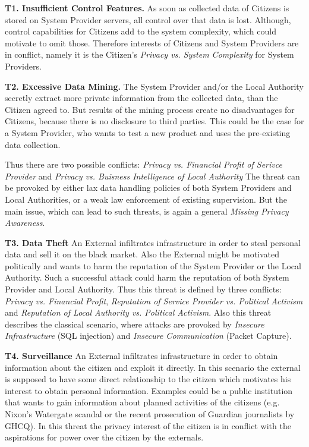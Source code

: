 \documentclass[runningheads,a4paper]{llncs}
\begin{document}
\textbf{T1. Insufficient Control Features.}
As soon as collected data of Citizens is stored on System Provider servers, all control over that data is lost. Although, control capabilities for Citizens add to the system complexity, which could motivate to omit those. Therefore interests of Citizens and System Providers are in conflict, namely it is the Citizen's \textit{Privacy vs. System Complexity} for System Providers.

\textbf{T2. Excessive Data Mining.}
The System Provider and/or the Local Authority secretly extract more private information from the collected data, than the Citizen agreed to. But results of the mining process create no disadvantages for Citizens, because there is no disclosure to third parties. This could be the case for a System Provider, who wants to test a new product and uses the pre-existing data collection.

Thus there are two possible conflicts: \textit{Privacy vs. Financial Profit of Serivce Provider} and  \textit{Privacy vs. Buisness Intelligence of Local Authority}
The threat can be provoked by either lax data handling policies of both System Providers and Local Authorities, or a weak law enforcement of existing supervision.
But the main issue, which can lead to such threats, is again a general \textit{Missing Privacy Awareness}.

\textbf{T3. Data Theft}
An External infiltrates infrastructure in order to steal personal data and sell it on the black market. Also the External might be motivated politically and wants to harm the reputation of the System Provider or the Local Authority. Such a successful attack could harm the reputation of both System Provider and Local Authority. Thus this threat is defined by three conflicts: \textit{Privacy vs. Financial Profit}, \textit{Reputation of Service Provider vs. Political Activism} and \textit{Reputation of Local Authority vs. Political Activism}.
Also this threat describes the classical scenario, where attacks are provoked by \textit{Insecure Infrastructure} (SQL injection) and \textit{Insecure Communication} (Packet Capture).

\textbf{T4. Surveillance}
An External infiltrates infrastructure in order to obtain information
about the citizen and exploit it directly.  In this scenario the
external is supposed to have some direct relationship to the citizen
which motivates his interest to obtain personal information.  Examples
could be a public institution that wants to gain information about
planned activities of the citizens (e.g. Nixon's Watergate scandal or
the recent prosecution of Guardian journalists by GHCQ). 
In this threat the privacy interest of the citizen is in conflict with
the aspirations for power over the citizen by the externals.
\end{document}
